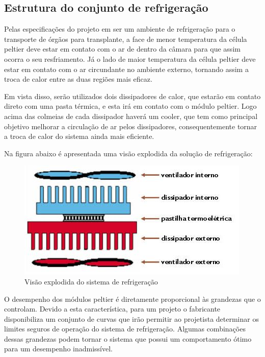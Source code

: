 \subsection{Estrutura do conjunto de refrigeração}
Pelas especificações do projeto em ser um ambiente de refrigeração para o transporte de órgãos para transplante, a face de menor temperatura da célula peltier deve estar em contato com o ar de dentro da câmara para que assim ocorra o seu resfriamento. Já o lado de maior temperatura da célula peltier deve estar em contato com o ar circundante no ambiente externo, tornando assim a troca de calor entre as duas regiões mais eficaz.

Em vista disso, serão utilizados dois dissipadores de calor, que estarão em contato direto com uma pasta térmica, e esta irá em contato com o módulo peltier. Logo acima das colmeias de cada dissipador haverá um cooler, que tem como principal objetivo melhorar a circulação de ar pelos dissipadores, consequentemente tornar a troca de calor do sistema ainda mais eficiente.

Na figura abaixo é apresentada uma visão explodida da solução de refrigeração:

\begin{figure}[H]
\begin{center}
\includegraphics[scale = 1]{figuras/Sistema_Ref.JPG}
\caption{Visão explodida do sistema de refrigeração}
\end{center}
\end{figure}

O desempenho dos módulos peltier é diretamente proporcional às grandezas que o controlam. Devido a esta característica, para um projeto o fabricante disponibiliza um conjunto de curvas que irão permitir ao projetista determinar os limites seguros de operação do sistema de refrigeração. Algumas combinações dessas grandezas podem tornar o sistema que possui um comportamento ótimo para um desempenho inadmissível. 

